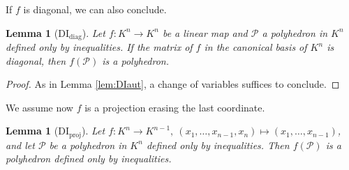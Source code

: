 \documentclass{elsarticle}
\theoremstyle{plain}
\newtheorem{lemma}[theorem]{Lemma}
\theoremstyle{definition}
\newcommand{\PP}{\mathcal{P}}
\begin{document}
If $f$ is diagonal, we can also conclude.

\begin{lemma}[DI${}_{\mathrm{diag}}$]
  Let $f : K^n \to K^n$ be a linear map and $\PP$ a polyhedron in $K^n$ defined only by inequalities.
  If the matrix of $f$ in the canonical basis of $K^n$ is diagonal,
  then $f(\PP)$ is a polyhedron. \label{lem:DIdiag}
\end{lemma}
\begin{proof}
As in Lemma \ref{lem:DIaut}, a change of variables suffices to conclude.
\end{proof}

We assume now $f$ is a projection erasing the last coordinate.

\begin{lemma}[DI${}_{\mathrm{proj}}$]
  Let $f : K^n \to K^{n-1}, \: (x_1,\dots,x_{n-1},x_n) \mapsto (x_1,\dots,x_{n-1})$, and let
  $\PP$ be a polyhedron in $K^n$ defined only by inequalities. 
  Then $f(\PP)$ is a polyhedron defined only by inequalities. \label{lem:DIproj}
\end{lemma}
\end{document}
